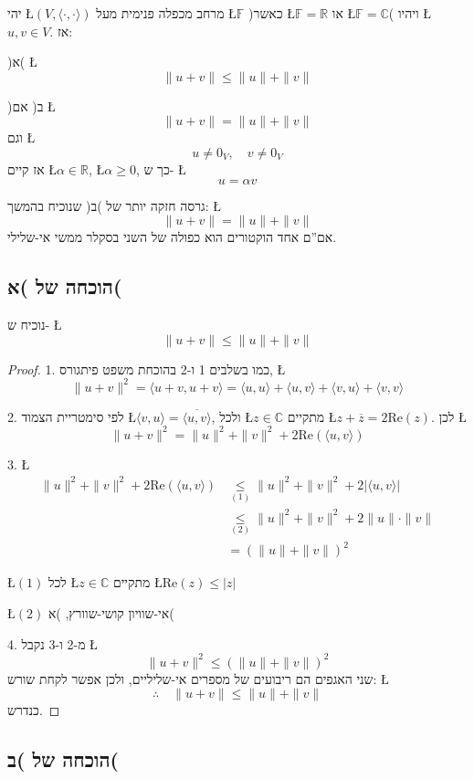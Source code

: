 \documentclass[english,hebrew]{article}
\begin{document}
יהי \L{$(V,\langle\cdot,\cdot\rangle)$} מרחב מכפלה פנימית מעל \L{$\mathbb{F}$}
)כאשר \L{$\mathbb{F}=\mathbb{R}$} או \L{$\mathbb{F}=\mathbb{C}$}(
ויהיו \L{$u,v\in V$}. אז:

)א( \L{%
\[
\|u+v\|\leq\|u\|+\|v\|
\]
}%

)ב( אם \L{%
\[
\|u+v\|=\|u\|+\|v\|
\]
}%
וגם \L{%
\[
u\neq0_{V},\quad v\neq0_{V}
\]
}%
אז קיים \L{$\alpha\in\mathbb{R}$}, \L{$\alpha\geq0$}, כך ש- \L{%
\[
u=\alpha v
\]
}%

גרסה חזקה יותר של )ב( שנוכיח בהמשך: \L{%
\[
\|u+v\|=\|u\|+\|v\|
\]
}%
אם\textquotedblright ם אחד הוקטורים הוא כפולה של השני בסקלר ממשי אי-שלילי.

\subsection{הוכחה של )א(}

נוכיח ש- \L{%
\[
\|u+v\|\leq\|u\|+\|v\|
\]
}%

\begin{proof}
1. כמו בשלבים 1 ו-2 בהוכחת משפט פיתגורס, \L{%
\[
\|u+v\|^{2}=\langle u+v,u+v\rangle=\langle u,u\rangle+\langle u,v\rangle+\langle v,u\rangle+\langle v,v\rangle
\]
}%

2. לפי סימטריית הצמוד \L{$\langle v,u\rangle=\overline{\langle u,v\rangle}$},
ולכל \L{$z\in\mathbb{C}$} מתקיים \L{$z+\overline{z}=2\text{Re}(z)$}.
לכן \L{%
\[
\|u+v\|^{2}=\|u\|^{2}+\|v\|^{2}+2\text{Re}\left(\langle u,v\rangle\right)
\]
}%

3. \L{%
\begin{align*}
\|u\|^{2}+\|v\|^{2}+2\text{Re}\left(\langle u,v\rangle\right) & \underset{(1)}{\leq}\|u\|^{2}+\|v\|^{2}+2\left|\langle u,v\rangle\right|\\
 & \underset{(2)}{\leq}\|u\|^{2}+\|v\|^{2}+2\|u\|\cdot\|v\|\\
 & =\left(\|u\|+\|v\|\right)^{2}
\end{align*}
}%

\L{$(1)$} לכל \L{$z\in\mathbb{C}$} מתקיים \L{$\text{Re}(z)\leq|z|$}

\L{$(2)$} אי-שוויון קושי-שוורץ, )א(

4. מ-2 ו-3 נקבל \L{%
\[
\|u+v\|^{2}\leq\left(\|u\|+\|v\|\right)^{2}
\]
}%
שני האגפים הם ריבועים של מספרים אי-שליליים, ולכן אפשר לקחת שורש: \L{%
\[
\therefore\quad\|u+v\|\leq\|u\|+\|v\|
\]
}%
כנדרש. 
\end{proof}

\subsection{הוכחה של )ב(}
\end{document}

